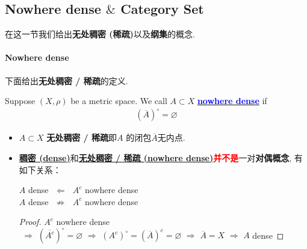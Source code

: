 \newpage

\subsection{Nowhere dense $\&$ Category Set}
\begin{center}
	在这一节我们给出\textbf{无处稠密 (稀疏)}以及\textbf{纲集}的概念.
\end{center}

\vspace{2em}
\paragraph{Nowhere dense}
	下面给出\textbf{无处稠密 / 稀疏}的定义.
	\begin{defn}\label{def 1.2.4}
		Suppose $(X,  \rho)$ be a metric space. We call $A \subset X$ \underline{\textcolor{blue}{\textbf{nowhere dense}}} if 
		\begin{align}
			\left( \overline{A} \right)^{\circ} = \varnothing
		\end{align}
		
		\vspace{2em}
		\begin{rmk}
			\begin{itemize}
				\item $A \subset X$ \textbf{无处稠密 / 稀疏}即$A$ 的闭包$\overline{A}$无内点.
				
				\vspace{6em}
				
				\item \underline{\textbf{稠密 (dense)}}和\underline{\textbf{无处稠密 / 稀疏 (nowhere dense)}}\textcolor{red}{\textbf{并不是}}一对\textbf{对偶概念}, 有如下关系：
				\begin{center}
					$A$ dense $\,\, \Leftarrow \,\,$ $A^c$ nowhere dense \\
					$A$ dense $\,\, \not\Rightarrow \,\,$ $A^c$ nowhere dense
				\end{center}
				
				\begin{proof}
					$A^c$ nowhere dense $\,\, \Rightarrow \,\, (\overline{A^c})^\circ = \varnothing \,\, \Rightarrow \,\, (A^c)^\circ = (\overline{A})^c = \varnothing \,\, \Rightarrow \,\, \overline{A} = X \,\, \Rightarrow \,\, A$ dense
				\end{proof}
				
				\vspace{6em}
				

\end{itemize}
\end{rmk}
\end{defn}
